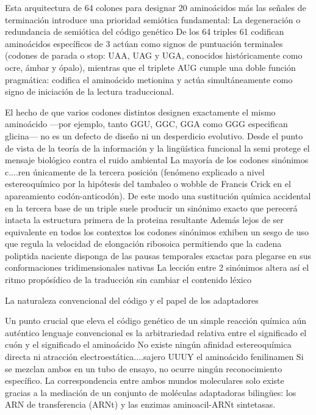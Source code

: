 Esta arquitectura de 64 colones para designar 20 aminoácidos más las señales de terminación introduce una prioridad semiótica fundamental: La degeneración o redundancia de semiótica del código genético
De los 64 triples 61 codifican aminoácidos específicos de 3 actúan como signos de puntuación terminales (codones de parada o stop: UAA, UAG y UGA, conocidos históricamente como ocre, ámbar y ópalo), mientras que el triplete AUG cumple una doble función pragmática: codifica el aminoácido metionina y actúa simultáneamente como signo de iniciación de la lectura traduccional.

El hecho de que varios codones distintos designen exactamente el mismo aminoácido —por ejemplo, tanto GGU, GGC, GGA como GGG especifican glicina— no es un defecto de diseño ni un desperdicio evolutivo. 
Desde el punto de vista de la teoría de la información y la lingüística funcional la semi protege el mensaje biológico contra el ruido ambiental 
La mayoría de los codones sinónimos c....ren únicamente de la tercera posición (fenómeno explicado a nivel estereoquímico por la hipótesis del tambaleo o wobble de Francis Crick en el apareamiento codón-anticodón). 
De este modo una sustitución química accidental en la tercera base de un triple suele producir un sinónimo exacto que perecerá intacta la estructura primera de la proteina resultante
Además lejos de ser equivalente en todos los contextos los codones sinónimos exhiben un sesgo de uso que regula la velocidad de elongación ribosoica permitiendo que la cadena poliptida naciente disponga de las pausas temporales exactas para plegarse en sus conformaciones tridimensionales nativas 
La lección entre 2 sinónimos altera así el ritmo propósídico de la traducción sin cambiar el contenido léxico

La naturaleza convencional del código y el papel de los adaptadores

Un punto crucial que eleva el código genético de un simple reacción química aún auténtico lenguaje convencional es la arbitrariedad relativa entre el significado el cuón y el significado el aminoácido 
No existe ningún afinidad estereoquímica directa ni atracción electroestática....sajero UUUY el aminoácido fenilinamen
Si se mezclan ambos en un tubo de ensayo, no ocurre ningún reconocimiento específico. La correspondencia entre ambos mundos moleculares solo existe gracias a la mediación de un conjunto de moléculas adaptadoras bilingües: los ARN de transferencia (ARNt) y las enzimas aminoacil-ARNt sintetasas.

